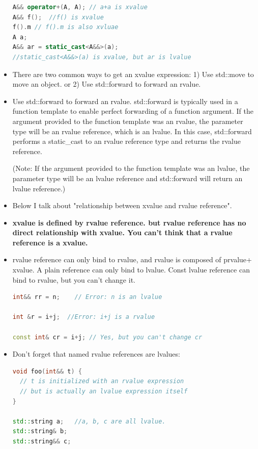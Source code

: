 \documentclass[a4paper,12pt,twoside]{book}
\begin{document}
\begin{itemize}
\begin{lstlisting}[frame=single, language=c++]
A&& operator+(A, A); // a+a is xvalue
A&& f();  //f() is xvalue
f().m // f().m is also xvluae
A a;
A&& ar = static_cast<A&&>(a);
//static_cast<A&&>(a) is xvalue, but ar is lvalue
\end{lstlisting}

\item There are two common ways to get an xvalue expression: 1) Use std::move to move an object. or
2) Use std::forward to forward an rvalue.

\item Use std::forward to forward an rvalue.  std::forward is typically used in a function template to enable perfect forwarding of a function argument. If the argument provided to the function template was an rvalue, the parameter type will be an rvalue reference, which is an lvalue. In this case, std::forward performs a static\_cast to an rvalue reference type and returns the rvalue reference.

(Note: If the argument provided to the function template was an lvalue, the parameter type will be an lvalue reference and std::forward will return an lvalue reference.)


\item Below I talk about "relationship between xvalue and rvalue reference".
\item \textbf{xvalue is defined by rvalue reference. but rvalue reference has no direct relationship with xvalue. You can't think that a rvalue reference is a xvalue. }

\item rvalue reference can only bind to rvalue, and rvalue is composed of prvalue+ xvalue. A plain  reference can only bind to lvalue. Const lvalue reference can bind to rvalue, but you can't change it.

\begin{lstlisting}[frame=single, language=c++]
int&& rr = n;    // Error: n is an lvalue

int &r = i+j;  //Error: i+j is a rvalue

const int& cr = i+j; // Yes, but you can't change cr
\end{lstlisting}

\item Don't forget that named rvalue references are lvalues:
\begin{lstlisting}[frame=single, language=c++]
void foo(int&& t) {
  // t is initialized with an rvalue expression
  // but is actually an lvalue expression itself
}

std::string a;   //a, b, c are all lvalue.
std::string& b;
std::string&& c;
\end{lstlisting}



\end{itemize}
\end{document}
